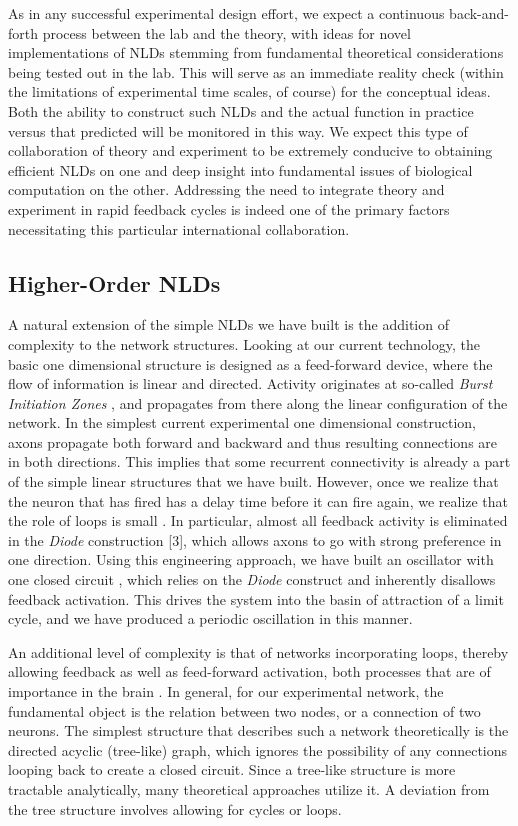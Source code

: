 As in any successful experimental design effort, we expect a continuous back-and-forth process between the lab and the theory, with ideas for novel implementations of NLDs stemming from fundamental theoretical considerations being tested out in the lab. This will serve as an immediate reality check (within the limitations of experimental time scales, of course) for the conceptual ideas. Both the ability to construct such NLDs and the actual function in practice versus that predicted will be monitored in this way. We expect this type of collaboration of theory and experiment to be extremely conducive to obtaining efficient NLDs on one and deep insight into fundamental issues of biological computation on the other. Addressing the need to integrate theory and experiment in rapid feedback cycles is indeed one of the primary factors necessitating this particular international collaboration.

\subsection{Higher-Order NLDs}
A natural extension of the simple NLDs we have built is the addition of complexity to the network structures. Looking at our current technology, the basic one dimensional structure is designed as a feed-forward device, where the flow of information is linear and directed. Activity originates at so-called {\it Burst Initiation Zones} \cite{Feinerman2007}, and propagates from there along the linear configuration of the network. In the simplest current experimental one dimensional construction, axons propagate both forward and backward and thus resulting connections are in both directions. This implies that some recurrent connectivity is already a part of the simple linear structures that we have built. However, once we realize that the neuron that has fired has a delay time before it can fire again, we realize that the role of loops is small \cite{Feinerman2006}. In particular, almost all feedback activity is eliminated in the {\it Diode} construction [3], which allows axons to go with strong preference in one direction. Using this engineering approach, we have built an oscillator with one closed circuit \cite{Feinerman2008}, which relies on the {\it Diode} construct and inherently disallows feedback activation. This drives the system into the basin of attraction of a limit cycle, and we have produced a periodic oscillation in this manner.

An additional level of complexity is that of networks incorporating loops, thereby allowing feedback as well as feed-forward activation, both processes that are of importance in the brain \cite{Ahissar2003}. In general, for our experimental network, the fundamental object is the relation between two nodes, or a connection of two neurons. The simplest structure that describes such a network theoretically is the directed acyclic (tree-like) graph, which ignores the possibility of any connections looping back to create a closed circuit. Since a tree-like structure is more tractable analytically, many theoretical approaches utilize it. A deviation from the tree structure involves allowing for cycles or loops.

